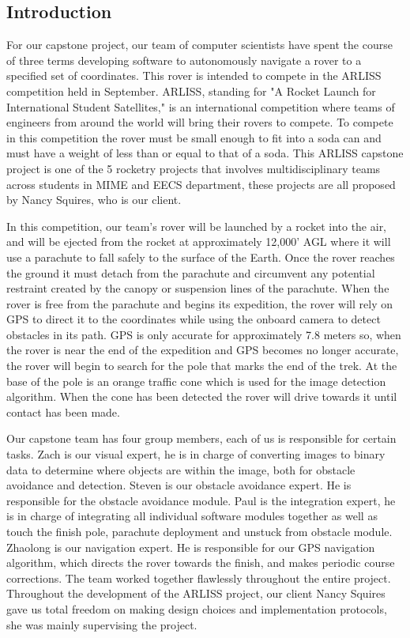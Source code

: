 \documentclass[10pt,letterpaper,onecolumn,draftclsnofoot,journal]{IEEEtran}
\begin{document}
\subsection{\textbf{Introduction}}
For our capstone project, our team of computer scientists have spent the course of three terms developing software to autonomously navigate a rover to a specified set of coordinates. This rover is intended to compete in the ARLISS competition held in September. ARLISS, standing for "A Rocket Launch for International Student Satellites," is an international competition where teams of engineers from around the world will bring their rovers to compete. To compete in this competition the rover must be small enough to fit into a soda can and must have a weight of less than or equal to that of a soda. This ARLISS capstone project is one of the 5 rocketry projects that involves multidisciplinary teams across students in MIME and EECS department, these projects are all proposed by Nancy Squires, who is our client.\vspace{.3cm}
\par
In this competition, our team's rover will be launched by a rocket into the air, and will be ejected from the rocket at approximately 12,000' AGL where it will use a parachute to fall safely to the surface of the Earth. Once the rover reaches the ground it must detach from the parachute and circumvent any potential restraint created by the canopy or suspension lines of the parachute. When the rover is free from the parachute and begins its expedition, the rover will rely on GPS to direct it to the coordinates while using the onboard camera to detect obstacles in its path. GPS is only accurate for approximately 7.8 meters so, when the rover is near the end of the expedition and GPS becomes no longer accurate, the rover will begin to search for the pole that marks the end of the trek. At the base of the pole is an orange traffic cone which is used for the image detection algorithm. When the cone has been detected the rover will drive towards it until contact has been made.\vspace{.3cm}
\par
Our capstone team has four group members, each of us is responsible for certain tasks. Zach is our visual expert, he is in charge of converting images to binary data to determine where objects are within the image, both for obstacle avoidance and detection. Steven is our obstacle avoidance expert. He is responsible for the obstacle avoidance module. Paul is the integration expert, he is in charge of integrating all individual software modules together as well as touch the finish pole, parachute deployment and unstuck from obstacle module. Zhaolong is our navigation expert. He is responsible for our GPS navigation algorithm, which directs the rover towards the finish, and makes periodic course corrections. The team worked together flawlessly throughout the entire project. Throughout the development of the ARLISS project, our client Nancy Squires gave us total freedom on making design choices and implementation protocols, she was mainly supervising the project.  
\end{document}

